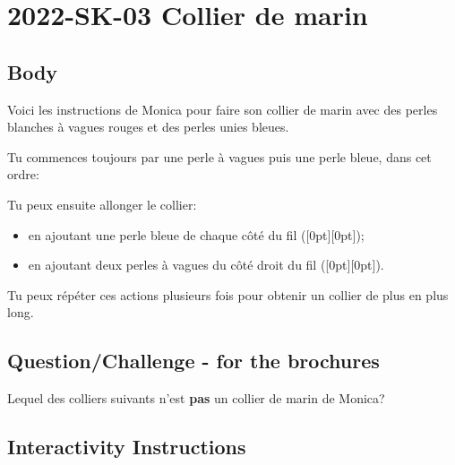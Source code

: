 \documentclass[a4paper,11pt]{report}
\newcommand{\taskGraphicsFolder}{..}
\begin{document}
\section*{\centering{} 2022-SK-03 Collier de marin}


\subsection*{Body}

Voici les instructions de Monica pour faire son collier de marin avec des perles blanches à vagues rouges et des perles unies bleues.

Tu commences toujours par une perle à vagues puis une perle bleue, dans cet ordre:

{\centering%
\par}

Tu peux ensuite allonger le collier:

\begin{itemize}
  \item en ajoutant une perle bleue de chaque côté du fil (\raisebox{-0.5ex}[0pt][0pt]{});
  \item en ajoutant deux perles à vagues du côté droit du fil (\raisebox{-0.5ex}[0pt][0pt]{}).
\end{itemize}

{\centering%
\par}

Tu peux répéter ces actions plusieurs fois pour obtenir un collier de plus en plus long.

{\em


\subsection*{Question/Challenge - for the brochures}

Lequel des colliers suivants n’est \textbf{pas} un collier de marin de Monica?

}


\subsection*{Interactivity Instructions}
\end{document}
